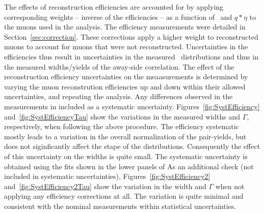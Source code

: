 The effects of reconstruction efficiencies are
  accounted for by  applying corresponding weights
  -- inverse of the efficiencies --  as a function of \pt\
  and $q*\eta$ to the muons used in the analysis.
The efficiency measurements were detailed
  in Section~\ref{sec:correction}.
These corrections apply a higher weight to reconstructed muons
  to account for muons that were not reconstructed.
Uncertainties in the efficiencies thus result in uncertainties
  in the measured \Dphi\ distributions and thus in the measured 
  widths/yields of the away-side correlation.
The effect of the reconstruction efficiency uncertainties on the
  meaasurements is determined by varying the muon reconstrution 
  efficiencies up and down within their allowed uncertainties, 
  and repeating the analysis.
Any differences observed in the measurements in included 
  as a systematic uncertainty. 
Figures~\ref{fig:SystEfficiency} and~\ref{fig:SystEfficiencyTau} 
  show the variations in the measured 
  widths and $\Gamma$, respectively, when following the above procedure.
The efficiency systematic mostly leads to a variation in the overall normalization 
  of the pair-yields, but does not siginficantly affect the stape of the distributions.
Consequently the effect of this uncertainty on the widths is quite small.
\iftoggle{IncludeYields}
{
  Figure~\ref{fig:SystEfficiency2} shows the variations in the yields.
}
{}
The systematic uncertainty is obtained using the fits shown in the lower panels of 
\iftoggle{IncludeYields}{
  Figures~\ref{fig:SystEfficiency}--\ref{fig:SystEfficiency2}.
  In addition to these uncertainties for the muon efficiency, 
    an additional uncertainty of 1\% is included, which accounts 
    for the muon ID reconstruction efficiency systematics~\cite{HION-2019-11}.
  \FuncDescr\ 
  Effects from the the trigger efficiency are also integrated into the 
    systematic uncertainties.
  The trigger efficiency uncertainty is included based on the difference between
    the change in the efficiency between most central and most-peripheral
    bins for medium and tight muons:
  \begin{eqnarray}
  \delta\epsilon=\frac{1}{2}(\Delta\epsilon_{\mathrm{medium}}-\Delta\epsilon_{\mathrm{tight}}),\nonumber
  \end{eqnarray} 
  with:
  \begin{eqnarray}
  \Delta\epsilon_{\mathrm{medium}}=\epsilon^{\mathrm{0-10\%}}-\epsilon^{\mathrm{60--100\%}}.\nonumber
  \end{eqnarray}
  These uncertainties are $\sim3\%$ leading to $\sim$6\% uncertainty for the pairs.
}
{
  Figures~\ref{fig:SystEfficiency} and~\ref{fig:SystEfficiencyTau}.
}
As an additional check (not included in systematic uncertainties),
  Figures~\ref{fig:SystEfficiency2} and~\ref{fig:SystEfficiency2Tau}
  show the variation in the width and $\Gamma$ when not applying 
  any efficiency corrections at all.
The variation is quite minimal and consistent with the nominal measurements
  within statistical uncertainties.



